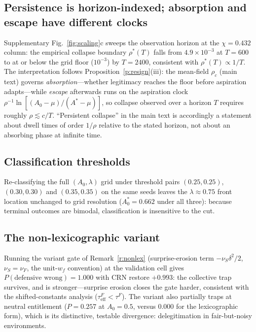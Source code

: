 \documentclass[11pt]{article}
\newcommand{\1}{\mathbf{1}}
\newcommand{\Astar}{A^{*}}
\begin{document}
\subsection{Persistence is horizon-indexed; absorption and escape have different clocks}
Supplementary Fig.~\ref{fig:scaling}c sweeps the observation horizon at the
$\chi=0.432$ column: the empirical collapse boundary $\rho^*(T)$ falls from
$4.9\times10^{-3}$ at $T=600$ to at or below the grid floor ($10^{-3}$) by $T=2400$,
consistent with $\rho^*(T)\propto 1/T$. The interpretation follows
Proposition~\ref{p:resign}(iii): the mean-field $\rho_c$ (main text) governs
\emph{absorption}---whether legitimacy reaches the floor before aspiration adapts---while
\emph{escape} afterwards runs on the aspiration clock $\rho^{-1}\ln[(A_0-\mu)/(\Astar-\mu)]$,
so collapse observed over a horizon $T$ requires roughly $\rho\lesssim c/T$. ``Persistent
collapse'' in the main text is accordingly a statement about dwell times of order $1/\rho$
relative to the stated horizon, not about an absorbing phase at infinite time.

\subsection{Classification thresholds}
Re-classifying the full $(A_0,\lambda)$ grid under threshold pairs $(0.25,0.25)$,
$(0.30,0.30)$ and $(0.35,0.35)$ on the same seeds leaves the $\lambda\approx0.75$ front
location unchanged to grid resolution ($A_0^*=0.662$ under all three): because terminal
outcomes are bimodal, classification is insensitive to the cut.

\subsection{The non-lexicographic variant}
Running the variant gate of Remark~\ref{r:nonlex} (surprise-erosion term
$-\nu_S\delta^2/2$, $\nu_S=\nu_F$, the unit-$w_f$ convention) at the validation cell gives
$P(\text{defensive wrong})=1.000$ with CRN restore $+0.993$: the collective trap survives,
and is stronger---surprise erosion closes the gate harder, consistent with the
shifted-constants analysis ($\tau^F_{\mathrm{eff}}<\tau^F$). The variant also partially
traps at neutral entitlement ($P=0.257$ at $A_0=0.5$, versus $0.000$ for the lexicographic
form), which is its distinctive, testable divergence: delegitimation in fair-but-noisy
environments.
\end{document}
